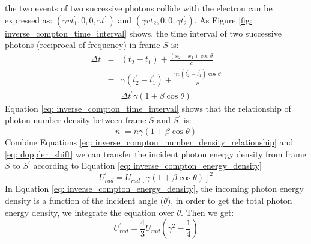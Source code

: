 \documentclass[12pt]{report}
\begin{document}
            the two events of two successive photons collide with the electron can be 
            expressed as:
            $\left(\gamma v t_{1}^{\prime}, 0, 0, \gamma t_{1}^{\prime}\right)$ and 
            $\left(\gamma v t_{2}^{\prime}, 0, 0, \gamma t_{2}^{\prime}\right)$. 
            As Figure \ref{fig: inverse_compton_time_interval} shows, the time interval of two 
            successive photons (reciprocal of frequency) in frame $S$ is: 
            \begin{eqnarray}
              \label{eq: inverse_compton_time_interval}
              \Delta t &=& \left(t_2 - t_1\right) + \frac{\left(x_2 - x_1\right) \cos{\theta}}{c}  \nonumber \\
                      &=& \gamma \left(t_{2}^{\prime} - t_{1}^{\prime}\right) + \frac{\gamma v \left(t_{2}^{\prime} - t_{1}^{\prime}\right) \cos{\theta}}{c} \nonumber \\
                      &=&  \Delta t^{\prime} \gamma \left(1 + \beta \cos{\theta}\right) 
            \end{eqnarray}
            Equation \ref{eq: inverse_compton_time_interval} shows that the relationship of photon 
            number density between frame $S$ and $S^{\prime}$ is:
            \begin{equation}
              \label{eq: inverse_compton_number_density_relationship}
              n^{\prime} = n \gamma \left(1 + \beta \cos{\theta}\right) 
            \end{equation}
            Combine Equations \ref{eq: inverse_compton_number_density_relationship} and 
            \ref{eq: doppler_shift} we can transfer the incident photon energy density from 
            frame $S$ to $S^{\prime}$ according to Equation \ref{eq: inverse_compton_energy_density}
            \begin{equation}
              \label{eq: inverse_compton_energy_density}
              U_{rad}^{\prime} = U_{rad} \left[\gamma \left(1 + \beta \cos{\theta}\right)\right]^{2}
            \end{equation}
            In Equation \ref{eq: inverse_compton_energy_density}, the incoming photon energy density 
            is a function of the incident angle ($\theta$), in order to get the total photon 
            energy density, we integrate the equation over $\theta$. Then we get: 
            \begin{equation}
              \label{eq: inverse_compton_energy_density_total}
              U_{rad}^{\prime} = \frac{4}{3} U_{rad} \left(\gamma^2 - \frac{1}{4}\right)
            \end{equation}
\end{document}
